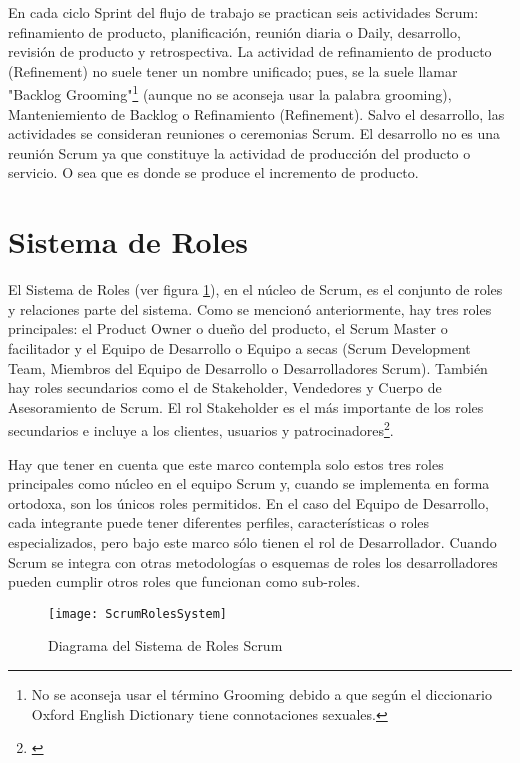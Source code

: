 En cada ciclo Sprint del flujo de trabajo se practican seis actividades Scrum: refinamiento de producto, planificación, reunión diaria o Daily, desarrollo, revisión de producto y retrospectiva. La actividad de refinamiento de producto (Refinement) no suele tener un nombre unificado; pues, se la suele llamar "Backlog Grooming"\footnote{No se aconseja usar el término Grooming debido a que según el diccionario Oxford English Dictionary tiene connotaciones sexuales.} (aunque no se aconseja usar la palabra grooming), Manteniemiento de Backlog o Refinamiento (Refinement). Salvo el desarrollo, las actividades se consideran reuniones o ceremonias Scrum. El desarrollo no es una reunión Scrum ya que constituye la actividad de producción del producto o servicio. O sea que es donde se produce el incremento de producto.

\section{Sistema de Roles}

El Sistema de Roles (ver figura \ref{fig:ScrumRolesSystem}), en el núcleo de Scrum, es el conjunto de roles y relaciones parte del sistema. Como se mencionó anteriormente, hay tres roles principales: el Product Owner o dueño del producto, el Scrum Master o facilitador y el Equipo de Desarrollo o Equipo a secas (Scrum Development Team, Miembros del Equipo de Desarrollo o Desarrolladores Scrum). También hay roles secundarios como el de Stakeholder, Vendedores y Cuerpo de Asesoramiento de Scrum. El rol Stakeholder es el más importante de los roles secundarios e incluye a los clientes, usuarios y patrocinadores\footnote{\cite{SBOK-2013}}.

Hay que tener en cuenta que este marco contempla solo estos tres roles principales como núcleo en el equipo Scrum y, cuando se implementa en forma ortodoxa, son los únicos roles permitidos. En el caso del Equipo de Desarrollo, cada integrante puede tener diferentes perfiles, características o roles especializados, pero bajo este marco sólo tienen el rol de Desarrollador. Cuando Scrum se integra con otras metodologías o esquemas de roles los desarrolladores pueden cumplir otros roles que funcionan como sub-roles.

\begin{figure}[h]
  \centering
  \texttt{[image: ScrumRolesSystem]}
  \caption{Diagrama del Sistema de Roles Scrum}
  \centering
  \label{fig:ScrumRolesSystem} %
\end{figure}

